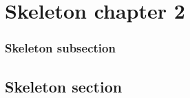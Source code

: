 \chapter{Skeleton chapter 2}

\lipsum[3-3]

\subsection{Skeleton subsection}
\lipsum[1-1]

\section{Skeleton section}
\lipsum[2-2]

